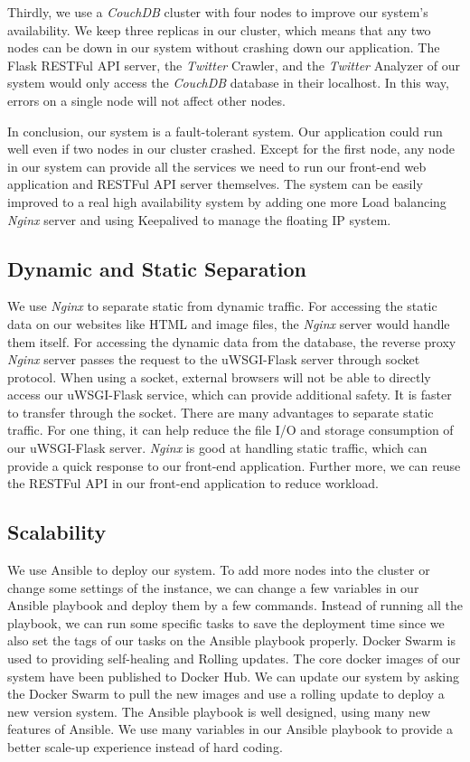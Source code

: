 \documentclass{article}
\begin{document}
Thirdly, we use a \textit{CouchDB} cluster with four nodes to improve our system's availability. We keep three replicas in our cluster, which means that any two nodes can be down in our system without crashing down our application. The Flask RESTFul API server, the \textit{Twitter} Crawler, and the \textit{Twitter} Analyzer of our system would only access the \textit{CouchDB} database in their localhost. In this way, errors on a single node will not affect other nodes. 

In conclusion, our system is a fault-tolerant system. Our application could run well even if two nodes in our cluster crashed. Except for the first node, any node in our system can provide all the services we need to run our front-end web application and RESTFul API server themselves. The system can be easily improved to a real high availability system by adding one more Load balancing \textit{Nginx} server and using Keepalived to manage the floating IP system.

\subsection{Dynamic and Static Separation}
We use \textit{Nginx} to separate static from dynamic traffic. For accessing the static data on our websites like HTML and image files, the \textit{Nginx} server would handle them itself. For accessing the dynamic data from the database, the reverse proxy \textit{Nginx} server passes the request to the uWSGI-Flask server through socket protocol. When using a socket, external browsers will not be able to directly access our uWSGI-Flask service, which can provide additional safety. It is faster to transfer through the socket. There are many advantages to separate static traffic. For one thing, it can help reduce the file I/O and storage consumption of our uWSGI-Flask server. \textit{Nginx} is good at handling static traffic, which can provide a quick response to our front-end application. Further more, we can reuse the RESTFul API in our front-end application to reduce workload.

\subsection{Scalability}
We use Ansible to deploy our system. To add more nodes into the cluster or change some settings of the instance, we can change a few variables in our Ansible playbook and deploy them by a few commands. Instead of running all the playbook, we can run some specific tasks to save the deployment time since we also set the tags of our tasks on the Ansible playbook properly. Docker Swarm is used to providing self-healing and Rolling updates. The core docker images of our system have been published to Docker Hub. We can update our system by asking the Docker Swarm to pull the new images and use a rolling update to deploy a new version system. The Ansible playbook is well designed, using many new features of Ansible. We use many variables in our Ansible playbook to provide a better scale-up experience instead of hard coding.
\end{document}
